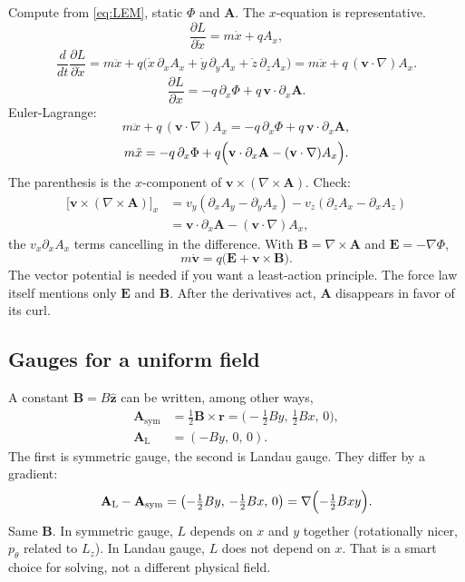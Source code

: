 \documentclass[11pt]{article}
\numberwithin{equation}{section}
\newcommand{\ddt}{\frac{d}{dt}}
\newcommand{\pd}[2]{\frac{\partial #1}{\partial #2}}
\newcommand{\vect}[1]{\mathbf{#1}}
\begin{document}
Compute from \eqref{eq:LEM}, static $\Phi$ and $\vect{A}$. The $x$-equation is representative.
\[
\pd{L}{\dot x} = m\dot x + q A_x,
\]
\[
\ddt\pd{L}{\dot x}
= m\ddot x + q\bigl(\dot x\,\partial_x A_x + \dot y\,\partial_y A_x + \dot z\,\partial_z A_x\bigr)
= m\ddot x + q\,(\vect{v}\cdot\nabla)A_x.
\]
\[
\pd{L}{x} = -q\,\partial_x\Phi + q\,\vect{v}\cdot\partial_x\vect{A}.
\]
Euler-Lagrange:
\[
m\ddot x + q\,(\vect{v}\cdot\nabla)A_x
= -q\,\partial_x\Phi + q\,\vect{v}\cdot\partial_x\vect{A},
\]
\[
m\ddot x
= -q\,\partial_x\Phi
+ q\Bigl(\vect{v}\cdot\partial_x\vect{A} - (\vect{v}\cdot\nabla)A_x\Bigr).
\]
The parenthesis is the $x$-component of $\vect{v}\times(\nabla\times\vect{A})$. Check:
\begin{align*}
\bigl[\vect{v}\times(\nabla\times\vect{A})\bigr]_x
&= v_y(\partial_x A_y-\partial_y A_x) - v_z(\partial_z A_x-\partial_x A_z)\\
&= \vect{v}\cdot\partial_x\vect{A} - (\vect{v}\cdot\nabla)A_x,
\end{align*}
the $v_x\partial_x A_x$ terms cancelling in the difference. With $\vect{B}=\nabla\times\vect{A}$ and $\vect{E}=-\nabla\Phi$,
\[
m\dot{\vect{v}} = q\bigl(\vect{E}+\vect{v}\times\vect{B}\bigr).
\]
The vector potential is needed if you want a least-action principle. The force law itself mentions only $\vect{E}$ and $\vect{B}$. After the derivatives act, $\vect{A}$ disappears in favor of its curl.

\subsection{Gauges for a uniform field}

A constant $\vect{B}=B\hat{\vect{z}}$ can be written, among other ways,
\begin{align}
\vect{A}_{\mathrm{sym}}
&= \tfrac12\vect{B}\times\vect{r}
= \bigl(-\tfrac12 B y,\,\tfrac12 B x,\,0\bigr), \label{eq:Asym}\\
\vect{A}_{\mathrm{L}}
&= (-B y,\, 0,\, 0). \label{eq:ALandau}
\end{align}
The first is symmetric gauge, the second is Landau gauge. They differ by a gradient:
\[
\vect{A}_{\mathrm{L}} - \vect{A}_{\mathrm{sym}}
= \bigl(-\tfrac12 B y,\, -\tfrac12 B x,\, 0\bigr)
= \nabla\Bigl(-\tfrac12 B x y\Bigr).
\]
Same $\vect{B}$. In symmetric gauge, $L$ depends on $x$ and $y$ together (rotationally nicer, $p_\theta$ related to $L_z$). In Landau gauge, $L$ does not depend on $x$. That is a smart choice for solving, not a different physical field.
\end{document}
